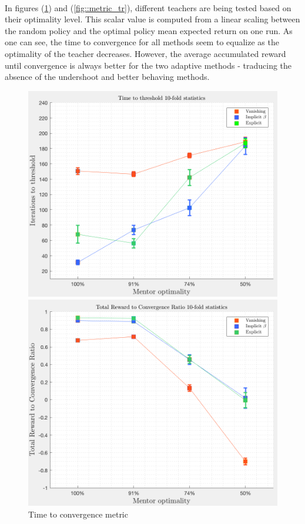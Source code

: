 \documentclass[a4paper]{report}
\begin{document}
{{{{				\paragraph{} In figures (\ref{fig::metric_tt}) and (\ref{fig::metric_tr}), different teachers are being tested based on their optimality level. This scalar value is computed from a linear scaling between the random policy and the optimal policy mean expected return on one run. As one can see, the time to convergence for all methods seem to equalize as the optimality of the teacher decreases. However, the average accumulated reward until convergence is always better for the two adaptive methods - traducing the absence of the undershoot and better behaving methods. 
				
				\begin{figure}[h!]
					\begin{minipage}{0.5\linewidth}
						\includegraphics[width=\linewidth]{tt_metric}
						\caption{Time to convergence metric}
						\label{fig::metric_tt}
					\end{minipage}
					\begin{minipage}{0.5\linewidth}
						\includegraphics[width=\linewidth]{tr_metric}

\end{minipage}
\end{figure}}}}}
\end{document}
